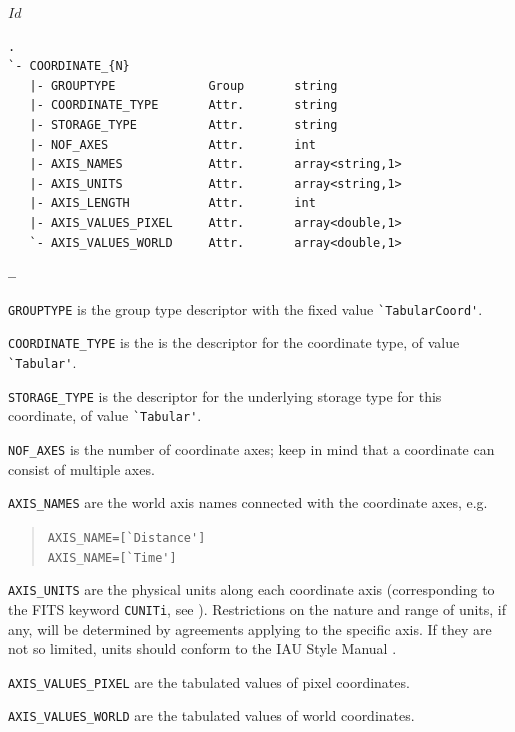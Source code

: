 \svnInfo $Id$

\begin{lstlisting}[float,caption={Structure of the tabular coordinate group.}]
.
`- COORDINATE_{N}
   |- GROUPTYPE             Group       string
   |- COORDINATE_TYPE       Attr.       string
   |- STORAGE_TYPE          Attr.       string
   |- NOF_AXES              Attr.       int
   |- AXIS_NAMES            Attr.       array<string,1>
   |- AXIS_UNITS            Attr.       array<string,1>
   |- AXIS_LENGTH           Attr.       int
   |- AXIS_VALUES_PIXEL     Attr.       array<double,1>
   `- AXIS_VALUES_WORLD     Attr.       array<double,1>
\end{lstlisting}

\begin{list}{\textbf{--}}{}
\item \verb|GROUPTYPE| is the group type descriptor with the fixed value 
  \verb|`TabularCoord'|. 
\item \verb|COORDINATE_TYPE| is the is the descriptor for the
  coordinate type, of value \verb|`Tabular'|.
\item \verb|STORAGE_TYPE| is the descriptor for the underlying storage
  type for this coordinate, of value \verb|`Tabular'|.
\item \verb|NOF_AXES| is the number of coordinate axes; keep in mind that a
  coordinate can consist of multiple axes.
\item \verb|AXIS_NAMES| are the world axis names connected with the
  coordinate axes, e.g.
  \begin{verse}
    \verb|AXIS_NAME=[`Distance']| \\
    \verb|AXIS_NAME=[`Time']|
  \end{verse}
\item \verb|AXIS_UNITS| are the physical units along each coordinate axis
  (corresponding to the FITS keyword \verb|CUNITi|, see \cite{fits.paper1}).
  Restrictions on the nature and range of units, if any, will be determined by
  agreements applying to the specific axis. If they are not so limited, units
  should conform to the IAU Style Manual \cite{mcnally.1988}.
\item \verb|AXIS_VALUES_PIXEL| are the tabulated values of pixel coordinates.
\item \verb|AXIS_VALUES_WORLD| are the tabulated values of world coordinates.
\end{list}
